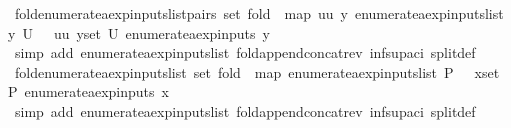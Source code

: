 \begin{isabellebody}
\isanewline
{}\isamarkupfalse%
\ fold{\isacharunderscore}enumerate{\isacharunderscore}aexp{\isacharunderscore}inputs{\isacharunderscore}list{\isacharunderscore}pairs{\isacharcolon}\ {\isachardoublequoteopen}set\ {\isacharparenleft}fold\ {\isacharparenleft}{\isacharat}{\isacharparenright}\ {\isacharparenleft}map\ {\isacharparenleft}{\isasymlambda}{\isacharparenleft}uu{\isacharcomma}\ y{\isacharparenright}{\isachardot}\ enumerate{\isacharunderscore}aexp{\isacharunderscore}inputs{\isacharunderscore}list\ y{\isacharparenright}\ U{\isacharparenright}\ {\isacharbrackleft}{\isacharbrackright}{\isacharparenright}\ {\isacharequal}\ {\isacharparenleft}{\isasymUnion}{\isacharparenleft}uu{\isacharcomma}\ y{\isacharparenright}{\isasymin}set\ U{\isachardot}\ enumerate{\isacharunderscore}aexp{\isacharunderscore}inputs\ y{\isacharparenright}{\isachardoublequoteclose}\isanewline
%
\isadelimproof
\ \ %
\endisadelimproof
%
\isatagproof
{}\isamarkupfalse%
\ {\isacharparenleft}simp\ add{\isacharcolon}\ enumerate{\isacharunderscore}aexp{\isacharunderscore}inputs{\isacharunderscore}list\ fold{\isacharunderscore}append{\isacharunderscore}concat{\isacharunderscore}rev\ inf{\isacharunderscore}sup{\isacharunderscore}aci{\isacharparenleft}{}{\isacharparenright}\ split{\isacharunderscore}def{\isacharparenright}%
\endisatagproof
{\isafoldproof}%
%
\isadelimproof
\isanewline
%
\endisadelimproof
\isanewline
{}\isamarkupfalse%
\ fold{\isacharunderscore}enumerate{\isacharunderscore}aexp{\isacharunderscore}inputs{\isacharunderscore}list{\isacharcolon}\ {\isachardoublequoteopen}set\ {\isacharparenleft}fold\ {\isacharparenleft}{\isacharat}{\isacharparenright}\ {\isacharparenleft}map\ enumerate{\isacharunderscore}aexp{\isacharunderscore}inputs{\isacharunderscore}list\ P{\isacharparenright}\ {\isacharbrackleft}{\isacharbrackright}{\isacharparenright}\ {\isacharequal}\ {\isacharparenleft}{\isasymUnion}x{\isasymin}set\ P{\isachardot}\ enumerate{\isacharunderscore}aexp{\isacharunderscore}inputs\ x{\isacharparenright}{\isachardoublequoteclose}\isanewline
%
\isadelimproof
\ \ %
\endisadelimproof
%
\isatagproof
{}\isamarkupfalse%
\ {\isacharparenleft}simp\ add{\isacharcolon}\ enumerate{\isacharunderscore}aexp{\isacharunderscore}inputs{\isacharunderscore}list\ fold{\isacharunderscore}append{\isacharunderscore}concat{\isacharunderscore}rev\ inf{\isacharunderscore}sup{\isacharunderscore}aci{\isacharparenleft}{}{\isacharparenright}\ split{\isacharunderscore}def{\isacharparenright}%
\endisatagproof
{\isafoldproof}%
%
\isadelimproof

\end{isabellebody}
